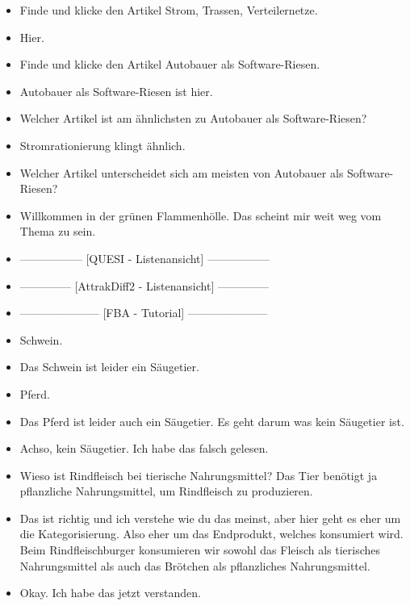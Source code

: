 {\begin{itemize}[]
        \item {} Finde und klicke den Artikel \flqq Strom, Trassen, Verteilernetze\frqq{}.
        \item {} Hier.
        \item {} Finde und klicke den Artikel \flqq Autobauer als Software-Riesen\frqq{}.
        \item {} \flqq Autobauer als Software-Riesen\frqq{} ist hier.
        \item {} Welcher Artikel ist am ähnlichsten zu \flqq Autobauer als Software-Riesen\frqq{}?
        \item {} \flqq Stromrationierung\frqq{} klingt ähnlich.
        \item {} Welcher Artikel unterscheidet sich am meisten von \flqq Autobauer als Software-Riesen\frqq{}?
        \item {} \flqq Willkommen in der grünen Flammenhölle\frqq{}. Das scheint mir weit weg vom Thema zu sein.
        \item {-----------------} [QUESI - Listenansicht] {-----------------}
        \item {--------------} [AttrakDiff2 - Listenansicht] {--------------}
        \item {---------------------} [FBA - Tutorial] {---------------------}
        \item {} Schwein.
        \item {} Das Schwein ist leider ein Säugetier.
        \item {} Pferd.
        \item {} Das Pferd ist leider auch ein Säugetier. Es geht darum was kein Säugetier ist.
        \item {} Achso, kein Säugetier. Ich habe das falsch gelesen.
        \item {} Wieso ist Rindfleisch bei tierische Nahrungsmittel?
              Das Tier benötigt ja pflanzliche Nahrungsmittel, um Rindfleisch zu produzieren.
        \item {} Das ist richtig und ich verstehe wie du das meinst, aber hier geht es eher um die Kategorisierung.
              Also eher um das Endprodukt, welches konsumiert wird.
              Beim Rindfleischburger konsumieren wir sowohl das Fleisch als tierisches Nahrungsmittel als auch das Brötchen als pflanzliches Nahrungsmittel.
        \item {} Okay. Ich habe das jetzt verstanden.

\end{itemize}}
